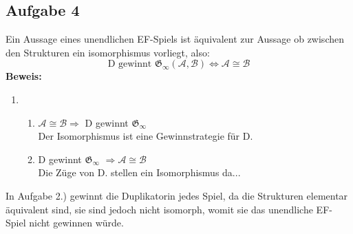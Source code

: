 \documentclass[a4paper,10pt]{article}
\begin{document}
\subsection*{Aufgabe 4}

Ein Aussage eines unendlichen EF-Spiels ist äquivalent zur Aussage ob zwischen den Strukturen ein isomorphismus vorliegt, also:
\[\text{D gewinnt }\mathfrak{G}_{\infty}(\mathcal{A}, \mathcal{B}) \Leftrightarrow  \mathcal{A} \cong \mathcal{B}\]
\textbf{Beweis:}
\begin{enumerate}
	\item 
	\begin{enumerate}
		\item 	$\mathcal{A} \cong \mathcal{B} \Rightarrow $ D gewinnt $\mathfrak{G}_{\infty}$ \\
			Der Isomorphismus ist eine Gewinnstrategie für D.
		\item 	D gewinnt $\mathfrak{G}_{\infty}$ $\Rightarrow \mathcal{A} \cong \mathcal{B} $ \\
			Die Züge von D. stellen ein Isomorphismus da...
	\end{enumerate}
\end{enumerate}
In Aufgabe 2.) gewinnt die Duplikatorin jedes Spiel, da die Strukturen elementar äquivalent sind, sie sind jedoch nicht isomorph, womit sie das unendliche EF-Spiel nicht gewinnen würde.
\end{document}
